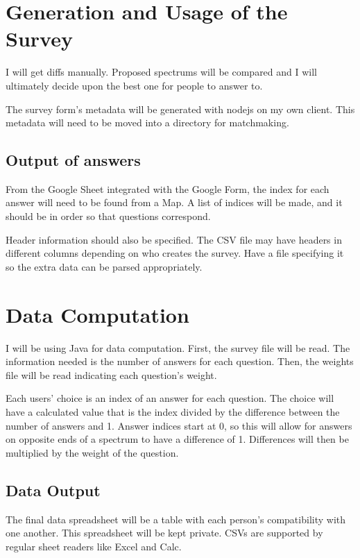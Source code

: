 \documentclass[12pt]{article}
\begin{document}
\section{Generation and Usage of the Survey}
I will get diffs manually. Proposed spectrums will be compared and I will
ultimately decide upon the best one for people to answer to.

The survey form's metadata will be generated with nodejs on my own client. This
metadata will need to be moved into a directory for matchmaking.

\subsection{Output of answers}
From the Google Sheet integrated with the Google Form, the index for each
answer will need to be found from a Map. A list of indices will be made, and it
should be in order so that questions correspond.

Header information should also be specified. The CSV file may have headers in
different columns depending on who creates the survey. Have a file specifying
it so the extra data can be parsed appropriately.

\section{Data Computation}
I will be using Java for data computation. First, the survey file will be read.
The information needed is the number of answers for each question. Then, the
weights file will be read indicating each question's weight.

Each users' choice is an index of an answer for each question. The choice
will have a calculated value that is the index divided by the difference between
the number of answers and 1. Answer indices start at 0, so this will allow for
answers on opposite ends of a spectrum to have a difference of 1. Differences
will then be multiplied by the weight of the question.

\subsection{Data Output}
The final data spreadsheet will be a table with each person's compatibility
with one another. This spreadsheet will be kept private. CSVs are supported by
regular sheet readers like Excel and Calc.
\end{document}
